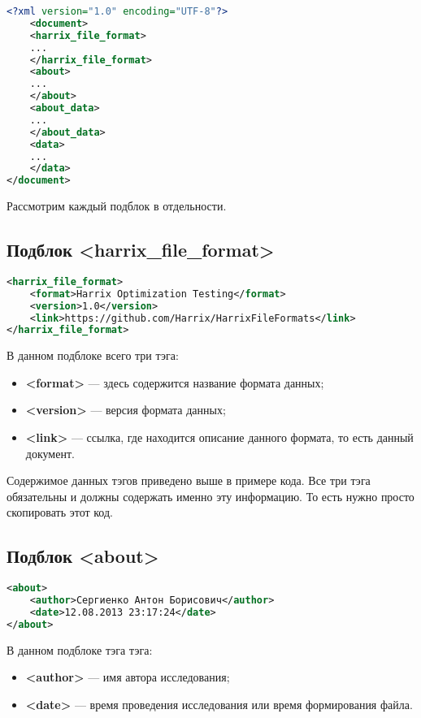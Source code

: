 \documentclass[a4paper,12pt]{article}
\begin{document}
\begin{lstlisting}[label=Part03, language=xml ,caption=Подблоки в файле Harrix Optimization Testing]
<?xml version="1.0" encoding="UTF-8"?>
	<document>
	<harrix_file_format>
	...
	</harrix_file_format>
	<about>
	...
	</about>
	<about_data>
	...
	</about_data>
	<data>
	...
	</data>
</document>
\end{lstlisting}

Рассмотрим каждый подблок в отдельности.

\subsection{Подблок <harrix\_file\_format>}

\begin{lstlisting}[label=Part04, language=xml ,caption=Подблок в файле Harrix Optimization Testing]
<harrix_file_format>
	<format>Harrix Optimization Testing</format>
	<version>1.0</version>
	<link>https://github.com/Harrix/HarrixFileFormats</link>
</harrix_file_format>
\end{lstlisting}

В данном подблоке всего три тэга:
\begin{itemize}
\item \textbf{<format>} --- здесь содержится название формата данных;
\item \textbf{<version>} --- версия формата данных;
\item \textbf{<link>} --- ссылка, где находится описание данного формата, то есть данный документ.
\end{itemize}

Содержимое данных тэгов приведено выше в примере кода. Все три тэга обязательны и должны содержать именно эту информацию. То есть нужно просто скопировать этот код.

\subsection{Подблок <about>}

\begin{lstlisting}[label=Part04_2, language=xml ,caption=Подблок в файле Harrix Optimization Testing]
<about>
	<author>Сергиенко Антон Борисович</author>
	<date>12.08.2013 23:17:24</date>
</about>
\end{lstlisting}

В данном подблоке тэга тэга:
\begin{itemize}
\item \textbf{<author>} --- имя автора исследования;
\item \textbf{<date>} --- время проведения исследования или время формирования файла.
\end{itemize}
\end{document}
